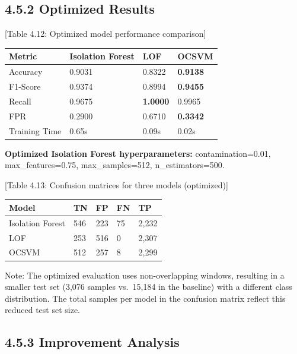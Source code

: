 \documentclass[
  a4paper]{report}
\newcounter{none} %
\begin{document}
\subsection{4.5.2 Optimized Results}\label{optimized-results}

{[}Table 4.12: Optimized model performance comparison{]}

{\def\LTcaptype{none} %
\begin{longtable}[]{@{}llll@{}}
\toprule\noalign{}
Metric & Isolation Forest & LOF & OCSVM \\
\midrule\noalign{}
\endhead
\bottomrule\noalign{}
\endlastfoot
Accuracy & 0.9031 & 0.8322 & \textbf{0.9138} \\
F1-Score & 0.9374 & 0.8994 & \textbf{0.9455} \\
Recall & 0.9675 & \textbf{1.0000} & 0.9965 \\
FPR & 0.2900 & 0.6710 & \textbf{0.3342} \\
Training Time & 0.65s & 0.09s & 0.02s \\
\end{longtable}
}

\textbf{Optimized Isolation Forest hyperparameters:} contamination=0.01,
max\_features=0.75, max\_samples=512, n\_estimators=500.

{[}Table 4.13: Confusion matrices for three models (optimized){]}

{\def\LTcaptype{none} %
\begin{longtable}[]{@{}lllll@{}}
\toprule\noalign{}
Model & TN & FP & FN & TP \\
\midrule\noalign{}
\endhead
\bottomrule\noalign{}
\endlastfoot
Isolation Forest & 546 & 223 & 75 & 2,232 \\
LOF & 253 & 516 & 0 & 2,307 \\
OCSVM & 512 & 257 & 8 & 2,299 \\
\end{longtable}
}

Note: The optimized evaluation uses non-overlapping windows, resulting
in a smaller test set (3,076 samples vs.~15,184 in the baseline) with a
different class distribution. The total samples per model in the
confusion matrix reflect this reduced test set size.

\subsection{4.5.3 Improvement Analysis}\label{improvement-analysis}
\end{document}
